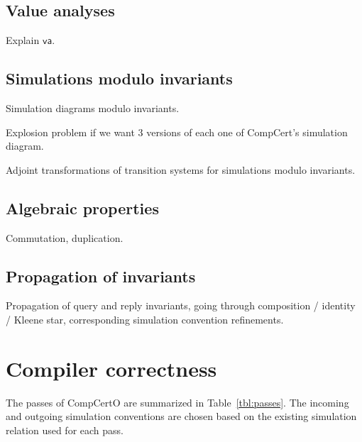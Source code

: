 \documentclass[acmsmall,authordraft]{acmart}
\newcommand{\kw}[1]{\ensuremath{ \mathsf{#1} }}
\begin{document}
\subsection{Value analyses}

Explain $\kw{va}$.

\subsection{Simulations modulo invariants}

Simulation diagrams modulo invariants.

Explosion problem if we want 3 versions of
each one of CompCert's simulation diagram.

Adjoint transformations of transition systems
for simulations modulo invariants.

\subsection{Algebraic properties}

Commutation, duplication.

\subsection{Propagation of invariants}

Propagation of query and reply invariants,
going through composition / identity / Kleene star,
corresponding simulation convention refinements.


\section{Compiler correctness} \label{sec:passes} %

The passes of CompCertO are summarized in Table~\ref{tbl:passes}.
The incoming and outgoing simulation conventions
are chosen based on the existing simulation relation
used for each pass.
\end{document}
